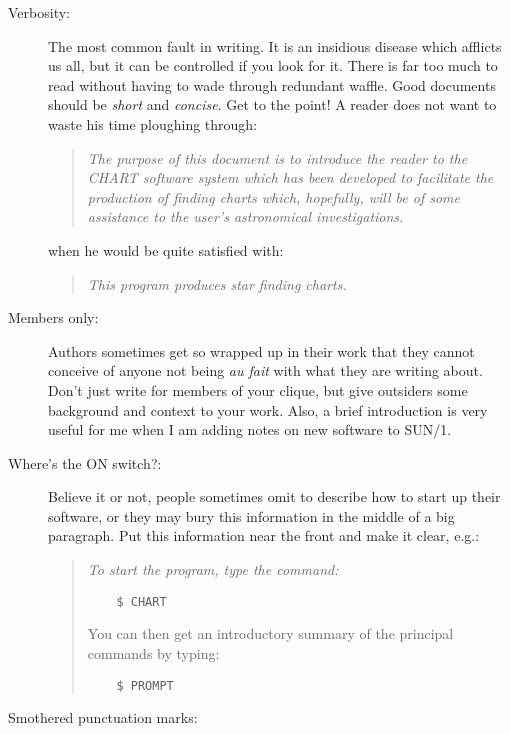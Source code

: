 \begin{description}

\item [Verbosity:]

The most common fault in writing.
It is an insidious disease which afflicts us all, but it can be controlled if
you look for it.
There is far too much to read without having to wade through redundant waffle.
Good documents should be {\em short}\/ and {\em concise}.
Get to the point!
A reader does not want to waste his time ploughing through:
\begin{quote}
{\em The purpose of this document is to introduce the reader to the CHART
software system which has been developed to facilitate the production of
finding charts which, hopefully, will be of some assistance to the user's
astronomical investigations.}
\end{quote}
when he would be quite satisfied with:
\begin{quote}
{\em This program produces star finding charts.}
\end{quote}

\item [Members only:]

Authors sometimes get so wrapped up in their work that they cannot conceive
of anyone not being {\em au fait}\/ with what they are writing about.
Don't just write for members of your clique, but give outsiders some background
and context to your work.
Also, a brief introduction is very useful for me when I am adding notes on new
software to SUN/1.

\item [Where's the ON switch?:]

Believe it or not, people sometimes omit to describe how to start up their
software, or they may bury this information in the middle of a big paragraph.
Put this information near the front and make it clear, e.g.:
\begin{quote}
{\em To start the program, type the command:
\begin{verbatim}
    $ CHART
\end{verbatim}
You can then get an introductory summary of the principal commands by typing:
\begin{verbatim}
    $ PROMPT
\end{verbatim}}
\end{quote}

\item [Smothered punctuation marks:]


\end{description}
